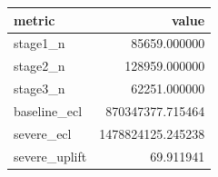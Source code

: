 \begin{tabular}{lr}
\toprule
metric & value \\
\midrule
stage1_n & 85659.000000 \\
stage2_n & 128959.000000 \\
stage3_n & 62251.000000 \\
baseline_ecl & 870347377.715464 \\
severe_ecl & 1478824125.245238 \\
severe_uplift & 69.911941 \\
\bottomrule
\end{tabular}
